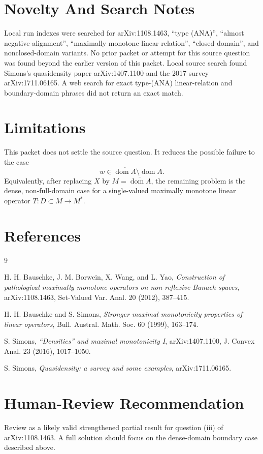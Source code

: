 \documentclass[11pt]{article}
\newcommand{\dom}{\operatorname{dom}}
\begin{document}
\section*{Novelty And Search Notes}

Local run indexes were searched for arXiv:1108.1463, ``type (ANA)'',
``almost negative alignment'', ``maximally monotone linear relation'',
``closed domain'', and nonclosed-domain variants. No prior packet or
attempt for this source question was found beyond the earlier version of
this packet. Local source search found Simons's quasidensity paper
arXiv:1407.1100 and the 2017 survey arXiv:1711.06165. A web search for
exact type-(ANA) linear-relation and boundary-domain phrases did not
return an exact match.

\section*{Limitations}

This packet does not settle the source question. It reduces the possible
failure to the case
\[
w\in\overline{\dom A}\setminus\dom A.
\]
Equivalently, after replacing \(X\) by \(M=\overline{\dom A}\), the
remaining problem is the dense, non-full-domain case for a single-valued
maximally monotone linear operator \(T:D\subset M\to M^*\).

\section*{References}

\begin{thebibliography}{9}

H. H. Bauschke, J. M. Borwein, X. Wang, and L. Yao,
\emph{Construction of pathological maximally monotone operators on
non-reflexive Banach spaces}, arXiv:1108.1463, Set-Valued Var. Anal.
20 (2012), 387--415.

H. H. Bauschke and S. Simons,
\emph{Stronger maximal monotonicity properties of linear operators},
Bull. Austral. Math. Soc. 60 (1999), 163--174.

S. Simons,
\emph{``Densities'' and maximal monotonicity I}, arXiv:1407.1100,
J. Convex Anal. 23 (2016), 1017--1050.

S. Simons,
\emph{Quasidensity: a survey and some examples}, arXiv:1711.06165.

\end{thebibliography}

\section*{Human-Review Recommendation}

Review as a likely valid strengthened partial result for question (iii)
of arXiv:1108.1463. A full solution should focus on the dense-domain
boundary case described above.
\end{document}
